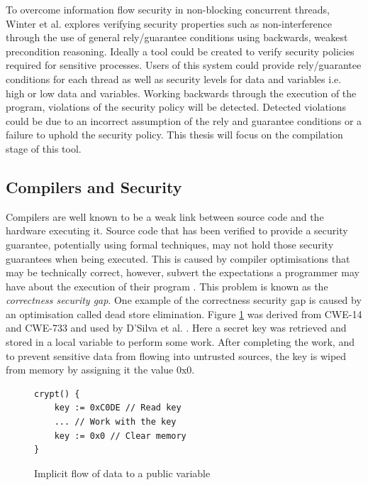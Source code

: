 \documentclass[twocolumn]{article}
\begin{document}
To overcome information flow security in non-blocking concurrent threads, Winter et al. \cite{winter2020information} explores verifying security properties such as non-interference through the use of general rely/guarantee conditions using backwards, weakest precondition reasoning. Ideally a tool could be created to verify security policies required for sensitive processes. Users of this system could provide rely/guarantee conditions for each thread as well as security levels for data and variables i.e. high or low data and variables. Working backwards through the execution of the program, violations of the security policy will be detected. Detected violations could be due to an incorrect assumption of the rely and guarantee conditions or a failure to uphold the security policy. This thesis will focus on the compilation stage of this tool.

\subsection{Compilers and Security}
Compilers are well known to be a weak link between source code and the hardware executing it. Source code that has been verified to provide a security guarantee, potentially using formal techniques, may not hold those security guarantees when being executed. This is caused by compiler optimisations that may be technically correct, however, subvert the expectations a programmer may have about the execution of their program \cite{d2015correctness}. This problem is known as the \textit{correctness security gap}. One example of the correctness security gap is caused by an optimisation called dead store elimination. Figure \ref{fig:deadstore} was derived from CWE-14 \cite{cwe14} and CWE-733 \cite{cwe733} and used by D'Silva et al. \cite{d2015correctness}. Here a secret key was retrieved and stored in a local variable to perform some work. After completing the work, and to prevent sensitive data from flowing into untrusted sources, the key is wiped from memory by assigning it the value 0x0.

\begin{figure}
    \begin{lstlisting}
crypt() {
    key := 0xC0DE // Read key
    ... // Work with the key
    key := 0x0 // Clear memory
}
        \end{lstlisting}
    \caption{Implicit flow of data to a public variable}
    \label{fig:deadstore}
\end{figure}
\end{document}
